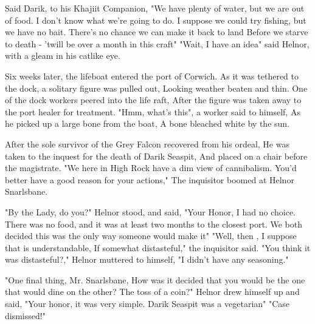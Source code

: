 Said Darik, to his Khajiit Companion, "We have plenty of water, but we are out of food. I don't know what we're going to do. I suppose we could try fishing, but we have no bait. There's no chance we can make it back to land Before we starve to death - 'twill be over a month in this craft" "Wait, I have an idea" said Helnor, with a gleam in his catlike eye.

Six weeks later, the lifeboat entered the port of Corwich. As it was tethered to the dock, a solitary figure was pulled out, Looking weather beaten and thin. One of the dock workers peered into the life raft, After the figure was taken away to the port healer for treatment. "Hmm, what's this", a worker said to himself, As he picked up a large bone from the boat, A bone bleached white by the sun.

After the sole survivor of the Grey Falcon recovered from his ordeal, He was taken to the inquest for the death of Darik Seaspit, And placed on a chair before the magistrate. "We here in High Rock have a dim view of cannibalism. You'd better have a good reason for your actions," The inquisitor boomed at Helnor Snarlsbane.

"By the Lady, do you?" Helnor stood, and said, "Your Honor, I had no choice. There was no food, and it was at least two months to the closest port. We both decided this was the only way someone would make it" "Well, then , I suppose that is understandable, If somewhat distasteful," the inquisitor said. "You think it was distasteful?," Helnor muttered to himself, "I didn't have any seasoning."

"One final thing, Mr. Snarlsbane, How was it decided that you would be the one that would dine on the other? The toss of a coin?" Helnor drew himself up and said, "Your honor, it was very simple. Darik Seaspit was a vegetarian" "Case dismissed!"